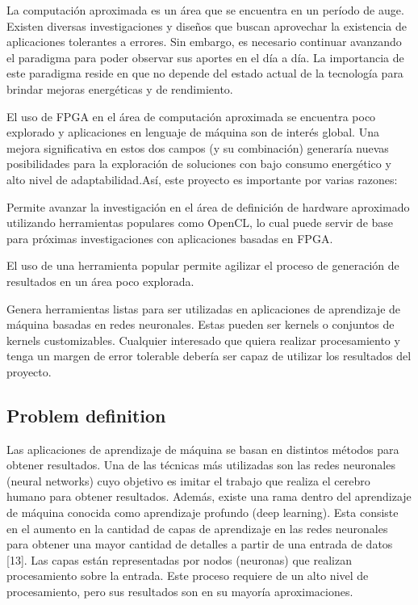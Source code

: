 La computación aproximada es un área que se encuentra en un período de auge. Existen diversas
investigaciones y diseños que buscan aprovechar la existencia de aplicaciones tolerantes a errores. Sin
embargo, es necesario continuar avanzando el paradigma para poder observar sus aportes en el día a
día. La importancia de este paradigma reside en que no depende del estado actual de la tecnología para
brindar mejoras energéticas y de rendimiento.

El uso de FPGA en el área de computación aproximada se encuentra poco explorado y aplicaciones en
lenguaje de máquina son de interés global. Una mejora significativa en estos dos campos (y su
combinación) generaría nuevas posibilidades para la exploración de soluciones con bajo consumo
energético y alto nivel de adaptabilidad.Así, este proyecto es importante por varias razones:

\begin{compactitem}
    \item Permite avanzar la investigación en el área de definición de hardware aproximado utilizando
herramientas populares como OpenCL, lo cual puede servir de base para próximas
investigaciones con aplicaciones basadas en FPGA. 
    \item El uso de una herramienta popular permite agilizar el proceso de generación de resultados en un área poco explorada.
    \item Genera herramientas listas para ser utilizadas en aplicaciones de aprendizaje de máquina
basadas en redes neuronales. Estas pueden ser kernels o conjuntos de kernels customizables.
Cualquier interesado que quiera realizar procesamiento y tenga un margen de error tolerable
debería ser capaz de utilizar los resultados del proyecto.
\end{compactitem}



\subsection{Problem definition}

Las aplicaciones de aprendizaje de máquina se basan en distintos métodos para obtener resultados. Una
de las técnicas más utilizadas son las redes neuronales (neural networks) cuyo objetivo es imitar el
trabajo que realiza el cerebro humano para obtener resultados. Además, existe una rama dentro del
aprendizaje de máquina conocida como aprendizaje profundo (deep learning). Esta consiste en el
aumento en la cantidad de capas de aprendizaje en las redes neuronales para obtener una mayor
cantidad de detalles a partir de una entrada de datos [13]. Las capas están representadas por nodos
(neuronas) que realizan procesamiento sobre la entrada. Este proceso requiere de un alto nivel de
procesamiento, pero sus resultados son en su mayoría aproximaciones.

